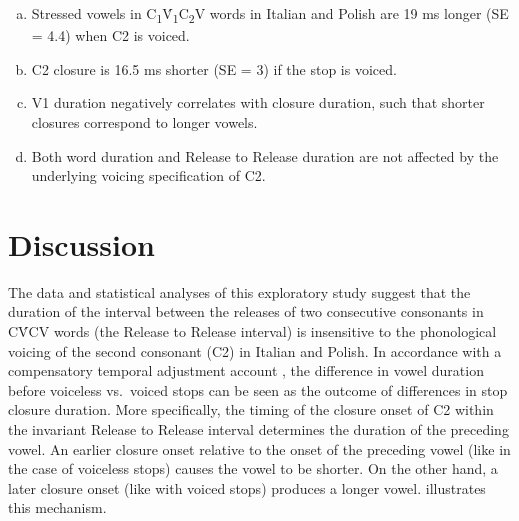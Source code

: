 \documentclass[12pt,]{article}
\begin{document}
\begin{enumerate}[(a)]
  \item Stressed vowels in C\textsubscript{1}V́\textsubscript{1}C\textsubscript{2}V words in Italian and Polish are 19 ms longer (SE = 4.4) when C2 is voiced.
  \item C2 closure is 16.5 ms shorter (SE = 3) if the stop is voiced.
  \item V1 duration negatively correlates with closure duration, such that shorter closures correspond to longer vowels.
  \item Both word duration and Release to Release duration are not affected by the underlying voicing specification of C2.
\end{enumerate}

\hypertarget{discussion}{%
\section{Discussion}\label{discussion}}

\label{s:discussion}

The data and statistical analyses of this exploratory study suggest that
the duration of the interval between the releases of two consecutive
consonants in CV́CV words (the Release to Release interval) is
insensitive to the phonological voicing of the second consonant (C2) in
Italian and Polish. In accordance with a compensatory temporal
adjustment account \citep{slis1969, lehiste1970}, the difference in
vowel duration before voiceless vs.~voiced stops can be seen as the
outcome of differences in stop closure duration. More specifically, the
timing of the closure onset of C2 within the invariant Release to
Release interval determines the duration of the preceding vowel. An
earlier closure onset relative to the onset of the preceding vowel (like
in the case of voiceless stops) causes the vowel to be shorter. On the
other hand, a later closure onset (like with voiced stops) produces a
longer vowel.  illustrates this mechanism.
\end{document}
